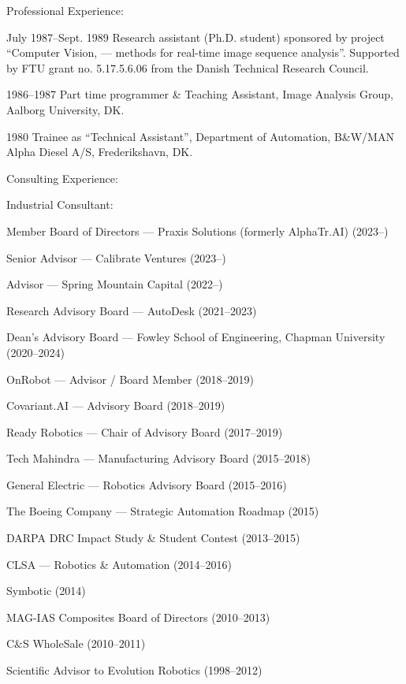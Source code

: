 \documentclass{article}
\newenvironment{sublist}{%
  \begin{list}{}{%
      \setlength{\itemsep}{0em}\setlength{\parsep}{0em}%
      \setlength{\topsep}{0em}\setlength{\parskip}{0em}%
    }%
}%
{ \end{list} }
\begin{document}
\begin{cv}
\begin{cvlist}{Professional Experience:}
\item[July 1987--Sept. 1989] Research assistant (Ph.D. student) sponsored
  by project ``Computer Vision, --- methods for real-time image
  sequence analysis''. Supported by FTU grant no. 5.17.5.6.06 from the
  Danish Technical Research Council.

\item[1986--1987] Part time programmer \& Teaching Assistant,
  Image Analysis Group, Aalborg University, DK.\@

\item[1980] Trainee as ``Technical Assistant'', Department of
  Automation, B\&W/MAN Alpha Diesel A/S, Frederikshavn, DK.\@
\end{cvlist}

\begin{cvlist}{Consulting Experience:}
\item Industrial Consultant:
\begin{sublist}
  \item Member Board of Directors --- Praxis Solutions (formerly AlphaTr.AI) (2023--)
  \item Senior Advisor --- Calibrate Ventures (2023--)
  \item Advisor --- Spring Mountain Capital (2022--)
  \item Research Advisory Board --- AutoDesk (2021--2023)
  \item Dean's Advisory Board --- Fowley School of Engineering, Chapman University (2020--2024)
  \item OnRobot --- Advisor / Board Member (2018--2019)
  \item Covariant.AI --- Advisory Board (2018--2019)
  \item Ready Robotics --- Chair of Advisory Board (2017--2019)
  \item Tech Mahindra --- Manufacturing Advisory Board (2015--2018)
  \item General Electric --- Robotics Advisory Board (2015--2016)
  \item The Boeing Company --- Strategic Automation Roadmap (2015)
  \item DARPA DRC Impact Study \& Student Contest (2013--2015)
  \item CLSA --- Robotics \& Automation (2014--2016)
  \item Symbotic (2014)
  \item MAG-IAS Composites Board of Directors (2010--2013)
  \item C\&S WholeSale (2010--2011)
  \item Scientific Advisor to Evolution Robotics (1998--2012)

\end{sublist}
\end{cvlist}
\end{cv}
\end{document}
